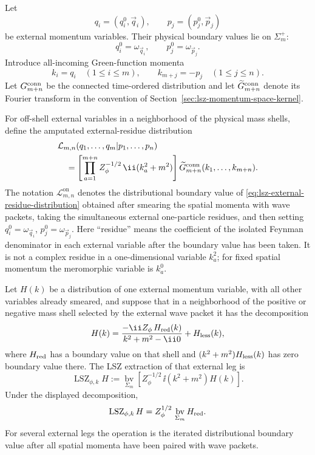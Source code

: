 Let
\[
  q_i=(q_i^0,\vec q_i),
  \qquad
  p_j=(p_j^0,\vec p_j)
\]
be external momentum variables. Their physical boundary values lie on
\(\Sigma_m^+\):
\[
  q_i^0=\omega_{\vec q_i},
  \qquad
  p_j^0=\omega_{\vec p_j}.
\]
Introduce all-incoming Green-function momenta
\[
  k_i=q_i\quad(1\le i\le m),
  \qquad
  k_{m+j}=-p_j\quad(1\le j\le n).
\]
Let \(G_{m+n}^{\rm conn}\) be the connected time-ordered distribution and let
\(\widetilde G_{m+n}^{\rm conn}\) denote its Fourier transform in the
convention of Section~\ref{sec:lsz-momentum-space-kernel}.

For off-shell external variables in a neighborhood of the physical mass shells,
define the amputated external-residue distribution
\begin{equation}
\begin{aligned}
&\mathcal L_{m,n}(q_1,\ldots,q_m|p_1,\ldots,p_n)
\\
&\quad =
  \left[
  \prod_{a=1}^{m+n}
  Z_\phi^{-1/2}\,\ii(k_a^2+m^2)
  \right]
  \widetilde G_{m+n}^{\rm conn}(k_1,\ldots,k_{m+n}).
\end{aligned}
\label{eq:lsz-external-residue-distribution}
\end{equation}
The notation
\(\mathcal L_{m,n}^{\mathrm{on}}\) denotes the distributional boundary value of
\eqref{eq:lsz-external-residue-distribution} obtained after smearing the
spatial momenta with wave packets, taking the simultaneous external
one-particle residues, and then setting
\(q_i^0=\omega_{\vec q_i}\), \(p_j^0=\omega_{\vec p_j}\).
Here ``residue'' means the coefficient of the isolated Feynman denominator in
each external variable after the boundary value has been taken.  It is not a
complex residue in a one-dimensional variable \(k_a^2\); for fixed spatial
momentum the meromorphic variable is \(k_a^0\).

\begin{definition}
\label{def:lsz-external-boundary-value-extraction}
Let \(H(k)\) be a distribution of one external momentum variable, with all
other variables already smeared, and suppose that in a neighborhood of the
positive or negative mass shell selected by the external wave packet it has
the decomposition
\[
  H(k)=\frac{-\ii Z_\phi\,H_{\rm red}(k)}{k^2+m^2-\ii0}
       +H_{\rm less}(k),
\]
where \(H_{\rm red}\) has a boundary value on that shell and
\((k^2+m^2)H_{\rm less}(k)\) has zero boundary value there.  The LSZ
extraction of that external leg is
\[
  \operatorname{LSZ}_{\phi,k}H
  :=
  \operatorname*{bv}_{\Sigma_m}
  \left[
    Z_\phi^{-1/2}\,\ii(k^2+m^2)H(k)
  \right].
\]
Under the displayed decomposition,
\[
  \operatorname{LSZ}_{\phi,k}H
  =
  Z_\phi^{1/2}\,\operatorname*{bv}_{\Sigma_m}H_{\rm red}.
\]
For several external legs the operation is the iterated distributional
boundary value after all spatial momenta have been paired with wave packets.
\end{definition}


